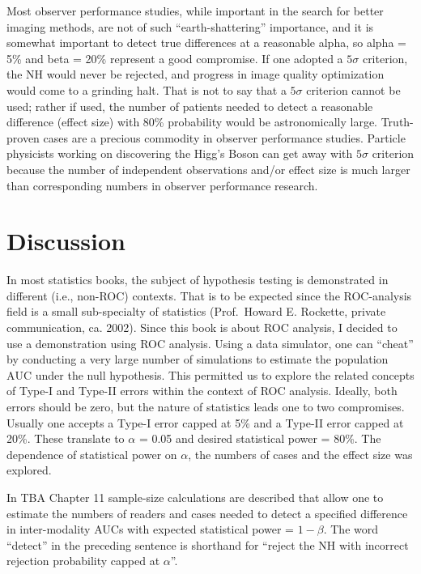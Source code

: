 \documentclass[
]{book}
\begin{document}
Most observer performance studies, while important in the search for better imaging methods, are not of such ``earth-shattering'' importance, and it is somewhat important to detect true differences at a reasonable alpha, so alpha = 5\% and beta = 20\% represent a good compromise. If one adopted a \(5\sigma\) criterion, the NH would never be rejected, and progress in image quality optimization would come to a grinding halt. That is not to say that a \(5\sigma\) criterion cannot be used; rather if used, the number of patients needed to detect a reasonable difference (effect size) with 80\% probability would be astronomically large. Truth-proven cases are a precious commodity in observer performance studies. Particle physicists working on discovering the Higg's Boson can get away with \(5\sigma\) criterion because the number of independent observations and/or effect size is much larger than corresponding numbers in observer performance research.

\hypertarget{hypothesis-testingDiscussion}{%
\section{Discussion}\label{hypothesis-testingDiscussion}}

In most statistics books, the subject of hypothesis testing is demonstrated in different (i.e., non-ROC) contexts. That is to be expected since the ROC-analysis field is a small sub-specialty of statistics (Prof.~Howard E. Rockette, private communication, ca. 2002). Since this book is about ROC analysis, I decided to use a demonstration using ROC analysis. Using a data simulator, one can ``cheat'' by conducting a very large number of simulations to estimate the population \(\text{AUC}\) under the null hypothesis. This permitted us to explore the related concepts of Type-I and Type-II errors within the context of ROC analysis. Ideally, both errors should be zero, but the nature of statistics leads one to two compromises. Usually one accepts a Type-I error capped at 5\% and a Type-II error capped at 20\%. These translate to \(\alpha\) = 0.05 and desired statistical power = 80\%. The dependence of statistical power on \(\alpha\), the numbers of cases and the effect size was explored.

In TBA Chapter 11 sample-size calculations are described that allow one to estimate the numbers of readers and cases needed to detect a specified difference in inter-modality AUCs with expected statistical power = \(1-\beta\). The word ``detect'' in the preceding sentence is shorthand for ``reject the NH with incorrect rejection probability capped at \(\alpha\)''.
\end{document}
